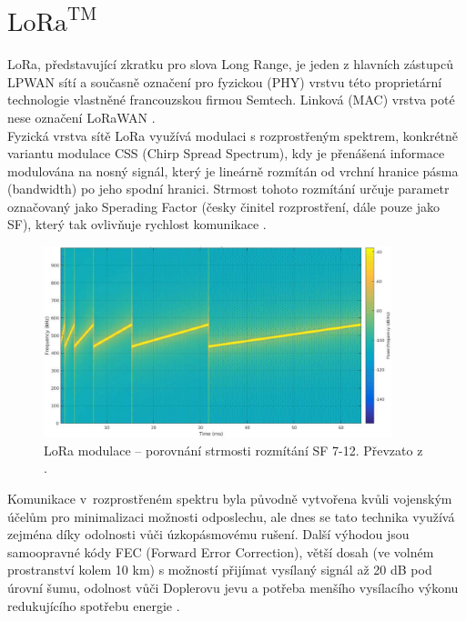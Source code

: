 \section{$\text{LoRa}^{\text{TM}}$}
    LoRa, představující zkratku pro slova Long Range, je jeden z hlavních zástupců LPWAN sítí a současně označení pro fyzickou (PHY) vrstvu této proprietární technologie vlastněné francouzskou firmou Semtech. Linková (MAC) vrstva poté nese označení LoRaWAN .\\
    Fyzická vrstva sítě LoRa využívá modulaci s rozprostřeným spektrem, konkrétně variantu modulace CSS (Chirp Spread Spectrum), kdy je přenášená informace modulována na nosný signál, který je lineárně rozmítán od vrchní hranice pásma (bandwidth) po jeho spodní hranici. Strmost tohoto rozmítání určuje parametr označovaný jako Sperading Factor (česky činitel rozprostření, dále pouze jako SF), který tak ovlivňuje rychlost komunikace \cite{manual:1}.\\
    
    \begin{figure} [!ht]
        \centering
        \caption{LoRa modulace – porovnání strmosti rozmítání SF 7-12. Převzato z \cite{picture_website:1}.}
        \includegraphics[width=0.9\textwidth]{LPWAN/Figs/lora_sf.png}
    \end{figure} 
    
    Komunikace v~rozprostřeném spektru byla původně vytvořena kvůli vojenským účelům pro minimalizaci možnosti odposlechu, ale dnes se tato technika využívá zejména díky odolnosti vůči úzkopásmovému rušení. Další výhodou jsou samoopravné kódy FEC (Forward Error Correction), větší dosah (ve volném prostranství kolem 10 km) s možností přijímat vysílaný signál až 20 dB pod úrovní šumu, odolnost vůči Doplerovu jevu a potřeba menšího vysílacího výkonu redukujícího spotřebu energie \cite{manual:1}.
    
